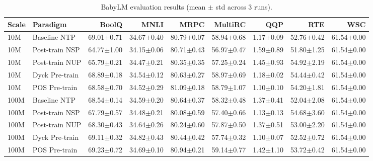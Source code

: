 \begin{table}[ht]
\centering
\caption{BabyLM evaluation results (mean $\pm$ std across 3 runs).}
\label{tab:babylm}
\begin{tabular}{llrrrrrrr}
\toprule
Scale & Paradigm & BoolQ & MNLI & MRPC & MultiRC & QQP & RTE & WSC \\
\midrule
10M & Baseline NTP & 69.01$\pm$0.71 & 34.67$\pm$0.40 & 80.79$\pm$0.07 & 58.94$\pm$0.68 & 1.17$\pm$0.09 & 52.76$\pm$0.42 & 61.54$\pm$0.00 \\
10M & Post-train NSP & 64.77$\pm$1.00 & 34.15$\pm$0.06 & 80.71$\pm$0.43 & 56.97$\pm$0.47 & 1.59$\pm$0.89 & 51.80$\pm$1.25 & 61.54$\pm$0.00 \\
10M & Post-train NUP & 65.79$\pm$0.21 & 34.47$\pm$0.21 & 80.35$\pm$0.35 & 57.25$\pm$0.24 & 1.45$\pm$0.93 & 54.92$\pm$2.19 & 61.54$\pm$0.00 \\
10M & Dyck Pre-train & 68.89$\pm$0.18 & 34.54$\pm$0.12 & 80.63$\pm$0.27 & 58.97$\pm$0.69 & 1.18$\pm$0.02 & 54.44$\pm$0.42 & 61.54$\pm$0.00 \\
10M & POS Pre-train & 68.58$\pm$0.70 & 34.52$\pm$0.29 & 81.09$\pm$0.18 & 58.79$\pm$1.07 & 1.10$\pm$0.10 & 54.20$\pm$1.81 & 61.54$\pm$0.00 \\
100M & Baseline NTP & 68.54$\pm$0.14 & 34.59$\pm$0.20 & 80.64$\pm$0.37 & 58.32$\pm$0.48 & 1.37$\pm$0.41 & 52.04$\pm$2.08 & 61.54$\pm$0.00 \\
100M & Post-train NSP & 67.79$\pm$0.57 & 34.48$\pm$0.21 & 80.08$\pm$0.59 & 57.40$\pm$0.66 & 1.13$\pm$0.13 & 54.68$\pm$3.60 & 61.54$\pm$0.00 \\
100M & Post-train NUP & 68.30$\pm$0.43 & 34.64$\pm$0.26 & 80.24$\pm$0.60 & 57.87$\pm$0.50 & 1.37$\pm$0.51 & 53.00$\pm$2.20 & 61.54$\pm$0.00 \\
100M & Dyck Pre-train & 69.11$\pm$0.32 & 34.82$\pm$0.43 & 80.44$\pm$0.42 & 57.74$\pm$0.32 & 1.10$\pm$0.07 & 52.52$\pm$0.72 & 61.54$\pm$0.00 \\
100M & POS Pre-train & 69.23$\pm$0.72 & 34.69$\pm$0.10 & 80.94$\pm$0.21 & 59.14$\pm$0.77 & 1.42$\pm$1.10 & 53.72$\pm$0.42 & 61.54$\pm$0.00 \\
\bottomrule
\end{tabular}
\end{table}